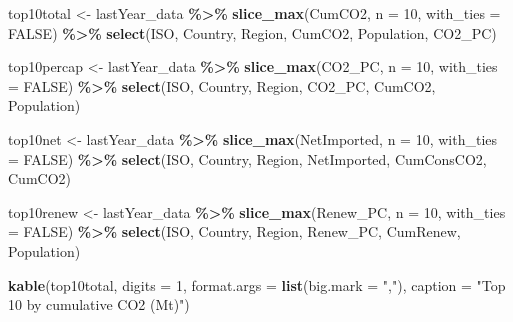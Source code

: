 \documentclass[
]{article}
\newenvironment{Shaded}{\begin{snugshade}}{\end{snugshade}}
\newcommand{\AttributeTok}[1]{\textcolor[rgb]{0.13,0.29,0.53}{#1}}
\newcommand{\ConstantTok}[1]{\textcolor[rgb]{0.56,0.35,0.01}{#1}}
\newcommand{\DecValTok}[1]{\textcolor[rgb]{0.00,0.00,0.81}{#1}}
\newcommand{\FunctionTok}[1]{\textcolor[rgb]{0.13,0.29,0.53}{\textbf{#1}}}
\newcommand{\NormalTok}[1]{#1}
\newcommand{\OtherTok}[1]{\textcolor[rgb]{0.56,0.35,0.01}{#1}}
\newcommand{\SpecialCharTok}[1]{\textcolor[rgb]{0.81,0.36,0.00}{\textbf{#1}}}
\newcommand{\StringTok}[1]{\textcolor[rgb]{0.31,0.60,0.02}{#1}}
\begin{document}
\begin{Shaded}
\begin{Highlighting}[]
\NormalTok{top10total }\OtherTok{\textless{}{-}}\NormalTok{ lastYear\_data }\SpecialCharTok{\%\textgreater{}\%}
  \FunctionTok{slice\_max}\NormalTok{(CumCO2, }\AttributeTok{n =} \DecValTok{10}\NormalTok{, }\AttributeTok{with\_ties =} \ConstantTok{FALSE}\NormalTok{) }\SpecialCharTok{\%\textgreater{}\%}
  \FunctionTok{select}\NormalTok{(ISO, Country, Region, CumCO2, Population, CO2\_PC)}

\NormalTok{top10percap }\OtherTok{\textless{}{-}}\NormalTok{ lastYear\_data }\SpecialCharTok{\%\textgreater{}\%}
  \FunctionTok{slice\_max}\NormalTok{(CO2\_PC, }\AttributeTok{n =} \DecValTok{10}\NormalTok{, }\AttributeTok{with\_ties =} \ConstantTok{FALSE}\NormalTok{) }\SpecialCharTok{\%\textgreater{}\%}
  \FunctionTok{select}\NormalTok{(ISO, Country, Region, CO2\_PC, CumCO2, Population)}

\NormalTok{top10net }\OtherTok{\textless{}{-}}\NormalTok{ lastYear\_data }\SpecialCharTok{\%\textgreater{}\%}
  \FunctionTok{slice\_max}\NormalTok{(NetImported, }\AttributeTok{n =} \DecValTok{10}\NormalTok{, }\AttributeTok{with\_ties =} \ConstantTok{FALSE}\NormalTok{) }\SpecialCharTok{\%\textgreater{}\%}
  \FunctionTok{select}\NormalTok{(ISO, Country, Region, NetImported, CumConsCO2, CumCO2)}

\NormalTok{top10renew }\OtherTok{\textless{}{-}}\NormalTok{ lastYear\_data }\SpecialCharTok{\%\textgreater{}\%}
  \FunctionTok{slice\_max}\NormalTok{(Renew\_PC, }\AttributeTok{n =} \DecValTok{10}\NormalTok{, }\AttributeTok{with\_ties =} \ConstantTok{FALSE}\NormalTok{) }\SpecialCharTok{\%\textgreater{}\%}
  \FunctionTok{select}\NormalTok{(ISO, Country, Region, Renew\_PC, CumRenew, Population)}

\FunctionTok{kable}\NormalTok{(top10total, }\AttributeTok{digits =} \DecValTok{1}\NormalTok{, }\AttributeTok{format.args =} \FunctionTok{list}\NormalTok{(}\AttributeTok{big.mark =} \StringTok{","}\NormalTok{),}
      \AttributeTok{caption =} \StringTok{"Top 10 by cumulative CO2 (Mt)"}\NormalTok{)}
\end{Highlighting}
\end{Shaded}
\end{document}
